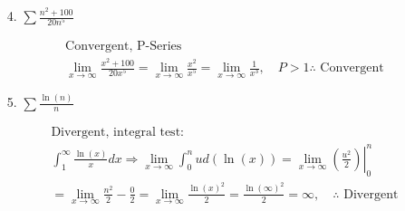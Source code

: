 \begin{itemize}
        \item [4.]
        $\sum\frac{n^{2}+100}{20n^{5}}$
        \\
        \begin{mdframed}
            \begin{equation*}
                \begin{gathered}
                    \boxed{\text{Convergent, P-Series}}                                \\
                      \lim_{x \to \infty}\frac{x^{2}+100}{20x^{5}}
                    = \lim_{x \to \infty}\frac{x^{2}}{x^{5}}
                    = \lim_{x \to \infty}\frac{1}{x^{3}}, \quad
                    P > 1 \therefore \text{ Convergent}
                \end{gathered}
            \end{equation*}
        \end{mdframed}
        
        \item [5.]
        $\sum\frac{\ln(n)}{n}$
        \\
        \begin{mdframed}
            \begin{equation*}
                \begin{gathered}
                    \boxed{\text{Divergent, integral test:}}                               \\
                      \int_{1}^{\infty}\frac{\ln(x)}{x}dx \Rightarrow 
                        \lim_{x \to \infty}\int_{0}^{n}ud(\ln(x))
                      = \lim_{x \to \infty}\left.\left(\frac{u^{2}}{2}\right)\right|_{0}^{n}\\
                      = \lim_{x \to \infty}\frac{n^{2}}{2}-\frac{0}{2}
                      = \lim_{x \to \infty}\frac{\ln(x)^{2}}{2}
                      = \frac{\ln(\infty)^{2}}{2} = \infty, \quad
                      \therefore \text{ Divergent}
                \end{gathered}
            \end{equation*}
        \end{mdframed}
    \end{itemize}
